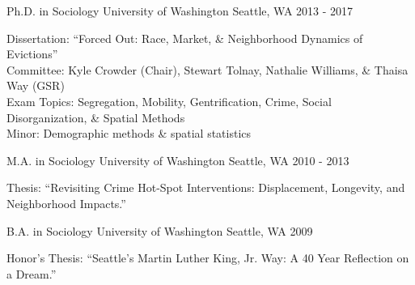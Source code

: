 

\begin{cventries}

  \cventry
    {Ph.D. in Sociology} %
    {University of Washington} %
    {Seattle, WA} %
    {2013 - 2017} %
    {
      \begin{cvitems} %
        {Dissertation: “Forced Out: Race, Market, \& Neighborhood Dynamics of Evictions”}\\ %
        {Committee: Kyle Crowder (Chair), Stewart Tolnay, Nathalie Williams, \& Thaisa Way (GSR)}\\
        {Exam Topics: Segregation, Mobility, Gentrification, Crime, Social Disorganization, \& Spatial Methods}\\
        {Minor: Demographic methods \& spatial statistics}
      \end{cvitems}
    }

  \cventry
    {M.A. in Sociology} %
    {University of Washington} %
    {Seattle, WA} %
    {2010 - 2013} %
    {
      \begin{cvitems} %
        {Thesis: “Revisiting Crime Hot-Spot Interventions: Displacement, Longevity, and Neighborhood Impacts.”}
      \end{cvitems}
    }

  \cventry
    {B.A. in Sociology} %
    {University of Washington} %
    {Seattle, WA} %
    {2009} %
    {
      \begin{cvitems} %
        {Honor’s Thesis: “Seattle’s Martin Luther King, Jr. Way: A 40 Year Reflection on a Dream.”}
      \end{cvitems}
    }

\end{cventries}
